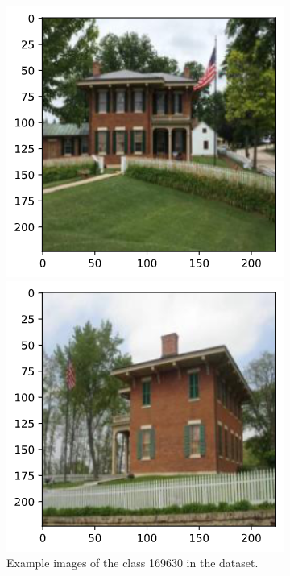 \documentclass[10pt,twocolumn,letterpaper]{article}
\begin{document}
\begin{figure}[]
\begin{minipage}[t]{0.23\textwidth}
    \end{minipage}
    \begin{minipage}[t]{0.23\textwidth}
        \includegraphics[width=\textwidth]{COMP4471_Final_Report/img/169630_03.png}
    \end{minipage}
    \begin{minipage}[t]{0.23\textwidth}
        \includegraphics[width=\textwidth]{COMP4471_Final_Report/img/169630_04.png}
    \end{minipage}
    \caption{Example images of the class 169630 in the dataset.}
    \label{fig:class_169630}
\end{figure}
\end{document}
